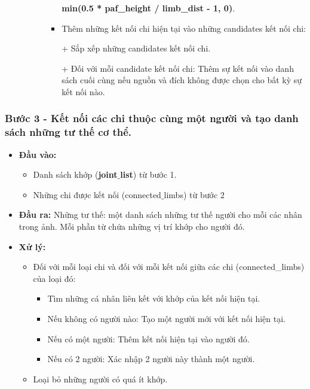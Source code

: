 \begin{itemize}
\begin{itemize}
\begin{itemize}
\begin{itemize}
			\textbf{min(0.5 * paf\_height / limb\_dist - 1, 0)}.
			\item Thêm những kết nối chi hiện tại vào những candidates kết nối chi:
			
			+ Sắp xếp những candidates kết nối chi.
			
			+ Đối với mỗi candidate kết nối chi: Thêm sự kết nối vào danh sách cuối cùng nếu nguồn và đích không được chọn cho bất kỳ sự kết nối nào.
			\end{itemize}
		\end{itemize}
	\end{itemize}
\end{itemize}

\subsubsection{Bước 3 - Kết nối các chi thuộc cùng một người và tạo danh sách những tư thế cơ thể.}
\begin{itemize}
\item \textbf{Đầu vào:}
	\begin{itemize}
	\item Danh sách khớp (\textbf{joint$\_$list}) từ bước 1.
	\item Những chi được kết nối (connected$\_$limbs) từ bước 2
	\end{itemize}
\item \textbf{Đầu ra:} Những tư thế: một danh sách những tư thế người cho mỗi các nhân trong ảnh. Mỗi phần từ chứa những vị trí khớp cho người đó.
\item \textbf{Xử lý:}
	\begin{itemize}
	\item Đối với mỗi loại chi và đối với mỗi kết nối giữa các chi (connected\_limbs) của loại đó:
		\begin{itemize}
		\item Tìm những cá nhân liên kết với khớp của kết nối hiện tại.
		\item Nếu không có người nào: Tạo một người mới với kết nối hiện tại.
		\item Nếu có một người: Thêm kết nối hiện tại vào người đó.
		\item Nếu có 2 người: Xác nhập 2 người này thành một người.
		\end{itemize}
	\item Loại bỏ những người có quá ít khớp.
	\end{itemize}
\end{itemize}

